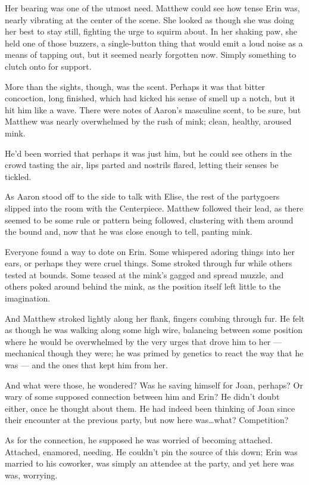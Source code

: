 Her bearing was one of the utmost need. Matthew could see how tense Erin was, nearly vibrating at the center of the scene. She looked as though she was doing her best to stay still, fighting the urge to squirm about. In her shaking paw, she held one of those buzzers, a single-button thing that would emit a loud noise as a means of tapping out, but it seemed nearly forgotten now. Simply something to clutch onto for support.

More than the sights, though, was the scent. Perhaps it was that bitter concoction, long finished, which had kicked his sense of smell up a notch, but it hit him like a wave. There were notes of Aaron's masculine scent, to be sure, but Matthew was nearly overwhelmed by the rush of mink; clean, healthy, aroused mink.

He'd been worried that perhaps it was just him, but he could see others in the crowd tasting the air, lips parted and nostrils flared, letting their senses be tickled.

As Aaron stood off to the side to talk with Elise, the rest of the partygoers slipped into the room with the Centerpiece. Matthew followed their lead, as there seemed to be some rule or pattern being followed, clustering with them around the bound and, now that he was close enough to tell, panting mink.

Everyone found a way to dote on Erin. Some whispered adoring things into her ears, or perhaps they were cruel things. Some stroked through fur while others tested at bounds. Some teased at the mink's gagged and spread muzzle, and others poked around behind the mink, as the position itself left little to the imagination.

And Matthew stroked lightly along her flank, fingers combing through fur. He felt as though he was walking along some high wire, balancing between some position where he would be overwhelmed by the very urges that drove him to her --- mechanical though they were; he was primed by genetics to react the way that he was --- and the ones that kept him from her.

And what were those, he wondered? Was he saving himself for Joan, perhaps? Or wary of some supposed connection between him and Erin? He didn't doubt either, once he thought about them. He had indeed been thinking of Joan since their encounter at the previous party, but now here was\ldots{}what? Competition?

As for the connection, he supposed he was worried of becoming attached. Attached, enamored, needing. He couldn't pin the source of this down; Erin was married to his coworker, was simply an attendee at the party, and yet here was was, worrying.

